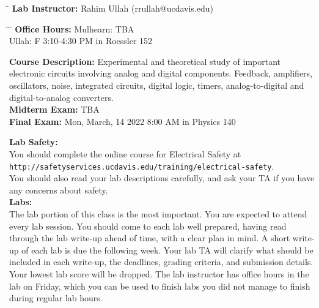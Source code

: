 \documentclass[12pt]{article}
\begin{document}
\noindent
\begin{tabbing}
\hspace*{8em} \= \kill 
\textbf{Lab Instructor:} \> Rahim Ullah (rrullah@ucdavis.edu) \\ 
\end{tabbing}

\noindent
\begin{tabbing}
\hspace*{8em}\= \hspace*{5em} \= \kill 
\textbf{Office Hours:}    \> Mulhearn: \> TBA \\
   \> Ullah: \> F 3:10-4:30 PM in Roessler 152 \\
\end{tabbing}

\noindent
\textbf {Course Description:}  
Experimental and theoretical study of important electronic circuits
involving analog and digital components.  Feedback, amplifiers,
oscillators, noise, integrated circuits, digital logic, timers,
analog-to-digital and digital-to-analog converters.\\

\noindent
\textbf{Midterm Exam:} TBA \\

\noindent
\textbf{Final Exam:} Mon, March, 14 2022 8:00 AM in Physics 140

\noindent
\textbf {Lab Safety:}\\
You should complete the online course for Electrical Safety at \\
{\tt http://safetyservices.ucdavis.edu/training/electrical-safety}.\\
You should also read your lab descriptions carefully, and ask your TA if you have any concerns about safety.\\

\newpage
\noindent
\textbf {Labs:}\\
The lab portion of this class is the most important.  You are expected
to attend every lab session.  You should come to each lab well
prepared, having read through the lab write-up ahead of time, with a
clear plan in mind.  A short write-up of each lab is due the following
week.  Your lab TA will clarify what should be included in each
write-up, the deadlines, grading criteria, and submission details.
Your lowest lab score will be dropped.  The lab instructor has office hours in the lab on Friday, which you can be used to finish labs you did not manage to finish during regular lab hours.\\
\end{document}
